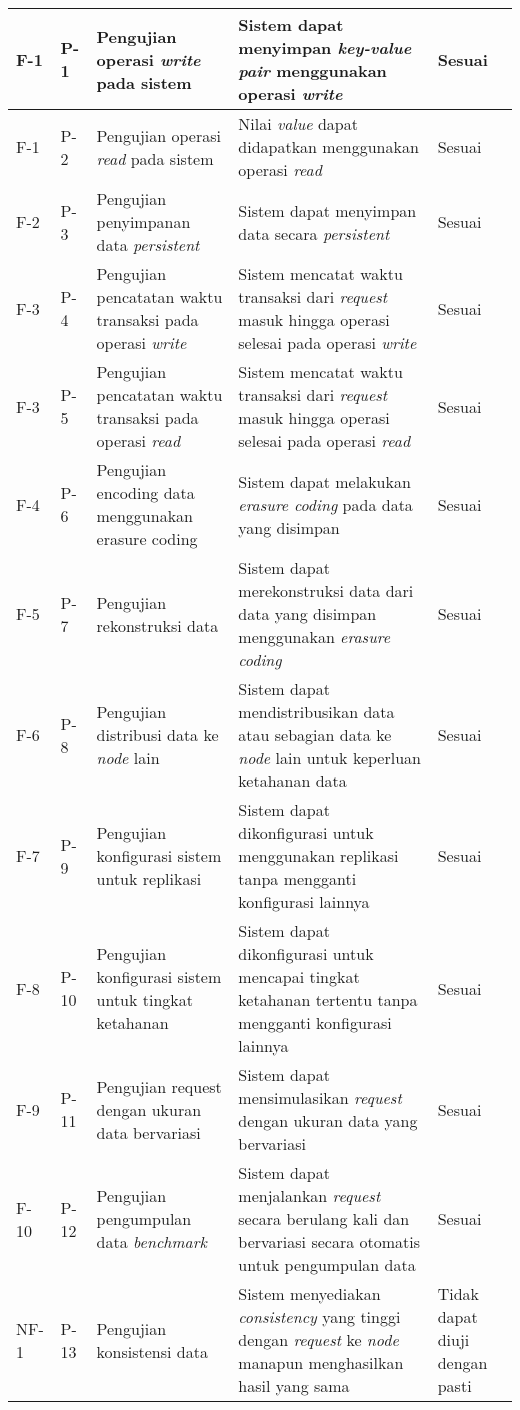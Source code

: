 \begin{longtable}{|p{2cm}|p{2cm}|p{3cm}|p{3cm}|p{2cm}|}
F-1 & P-1 & Pengujian operasi \textit{write} pada sistem & Sistem dapat menyimpan \textit{key-value pair} menggunakan operasi \textit{write} & Sesuai \\ \hline
F-1 & P-2 & Pengujian operasi \textit{read} pada sistem & Nilai \textit{value} dapat didapatkan menggunakan operasi \textit{read} & Sesuai \\ \hline
F-2 & P-3 & Pengujian penyimpanan data \textit{persistent} & Sistem dapat menyimpan data secara \textit{persistent} & Sesuai \\ \hline
F-3 & P-4 & Pengujian pencatatan waktu transaksi pada operasi \textit{write} & Sistem mencatat waktu transaksi dari \textit{request} masuk hingga operasi selesai pada operasi \textit{write} & Sesuai \\ \hline
F-3 & P-5 & Pengujian pencatatan waktu transaksi pada operasi \textit{read} & Sistem mencatat waktu transaksi dari \textit{request} masuk hingga operasi selesai pada operasi \textit{read} & Sesuai \\ \hline
F-4 & P-6 & Pengujian encoding data menggunakan erasure coding & Sistem dapat melakukan \textit{erasure coding} pada data yang disimpan & Sesuai \\ \hline
F-5 & P-7 & Pengujian rekonstruksi data & Sistem dapat merekonstruksi data dari data yang disimpan menggunakan \textit{erasure coding} & Sesuai \\ \hline
F-6 & P-8 & Pengujian distribusi data ke \textit{node} lain & Sistem dapat mendistribusikan data atau sebagian data ke \textit{node} lain untuk keperluan ketahanan data & Sesuai \\ \hline
F-7 & P-9 & Pengujian konfigurasi sistem untuk replikasi & Sistem dapat dikonfigurasi untuk menggunakan replikasi tanpa mengganti konfigurasi lainnya & Sesuai \\ \hline
F-8 & P-10 & Pengujian konfigurasi sistem untuk tingkat ketahanan & Sistem dapat dikonfigurasi untuk mencapai tingkat ketahanan tertentu tanpa mengganti konfigurasi lainnya & Sesuai \\ \hline
F-9 & P-11 & Pengujian request dengan ukuran data bervariasi & Sistem dapat mensimulasikan \textit{request} dengan ukuran data yang bervariasi & Sesuai \\ \hline
F-10 & P-12 & Pengujian pengumpulan data \textit{benchmark} & Sistem dapat menjalankan \textit{request} secara berulang kali dan bervariasi secara otomatis untuk pengumpulan data & Sesuai \\ \hline
NF-1 & P-13 & Pengujian konsistensi data & Sistem menyediakan \textit{consistency} yang tinggi dengan \textit{request} ke \textit{node} manapun menghasilkan hasil yang sama & Tidak dapat diuji dengan pasti \\ \hline

\end{longtable}
